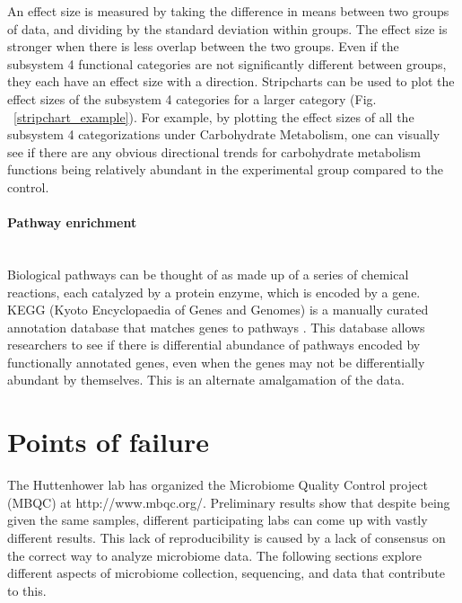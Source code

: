 An effect size is measured by taking the difference in means between two groups of data, and dividing by the standard deviation within groups. The effect size is stronger when there is less overlap between the two groups. Even if the subsystem 4 functional categories are not significantly different between groups, they each have an effect size with a direction. Stripcharts can be used to plot the effect sizes of the subsystem 4 categories for a larger category (Fig. ~\ref{stripchart_example}). For example, by plotting the effect sizes of all the subsystem 4 categorizations under Carbohydrate Metabolism, one can visually see if there are any obvious directional trends for carbohydrate metabolism functions being relatively abundant in the experimental group compared to the control.

\FloatBarrier

\paragraph{Pathway enrichment}\mbox{}\\
Biological pathways can be thought of as made up of a series of chemical reactions, each catalyzed by a protein enzyme, which is encoded by a gene. KEGG (Kyoto Encyclopaedia of Genes and Genomes) is a manually curated annotation database that matches genes to pathways \cite{kanehisa2000kegg}. This database allows researchers to see if there is differential abundance of pathways encoded by functionally annotated genes, even when the genes may not be differentially abundant by themselves. This is an alternate amalgamation of the data.

\section{Points of failure}
The Huttenhower lab has organized the Microbiome Quality Control project (MBQC) at http://www.mbqc.org/. Preliminary results show that despite being given the same samples, different participating labs can come up with vastly different results. This lack of reproducibility is caused by a lack of consensus on the correct way to analyze microbiome data. The following sections explore different aspects of microbiome collection, sequencing, and data that contribute to this.

